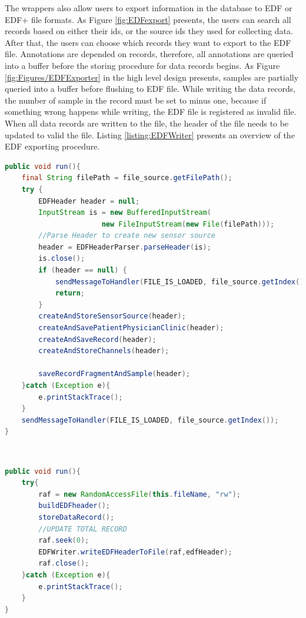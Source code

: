 The wrappers also allow users to export information in the database to EDF or EDF+ file formats. As Figure \ref{fig:EDFexport} presents, the users can search all records based on either their ids, or the source ids they used for collecting data. After that, the users can choose which records they want to export to the EDF file. Annotations are depended on records, therefore, all annotations are queried into a buffer before the storing procedure for data records begins. As Figure \ref{fig:Figures/EDFExporter} in the high level design presents, samples are partially queried into a buffer before flushing to EDF file. While writing the data records, the number of sample in the record must be set to minus one, because if something wrong happens while writing, the EDF file is registered as invalid file. When all data records are written to the file, the header of the file needs to be updated to valid the file. Listing \ref{listing:EDFWriter} presents an overview of the EDF exporting procedure.\\
\begin{minipage}{\linewidth}
\begin{lstlisting}[caption={EDF file reader}, label = {listing:EDFREADER}, captionpos=b, language=Java]
public void run(){
    final String filePath = file_source.getFilePath();
    try {
        EDFHeader header = null;
        InputStream is = new BufferedInputStream(
                       new FileInputStream(new File(filePath)));
        //Parse Header to create new sensor source
        header = EDFHeaderParser.parseHeader(is);
        is.close();
        if (header == null) {
            sendMessageToHandler(FILE_IS_LOADED, file_source.getIndex());
            return;
        }
        createAndStoreSensorSource(header);
        createAndSavePatientPhysicianClinic(header);
        createAndSaveRecord(header);
        createAndStoreChannels(header);

        saveRecordFragmentAndSample(header);
    }catch (Exception e){
        e.printStackTrace();
    }
    sendMessageToHandler(FILE_IS_LOADED, file_source.getIndex());
}
\end{lstlisting}
\end{minipage}\\
\begin{minipage}{\linewidth}
\begin{lstlisting}[caption={EDF file writer}, label = {listing:EDFWriter}, captionpos=b, language=Java]
public void run(){
    try{
        raf = new RandomAccessFile(this.fileName, "rw");
        buildEDFheader();
        storeDataRecord();
        //UPDATE TOTAL RECORD
        raf.seek(0);
        EDFWriter.writeEDFHeaderToFile(raf,edfHeader);
        raf.close();
    }catch (Exception e){
        e.printStackTrace();
    }
}
\end{lstlisting}
\end{minipage}
